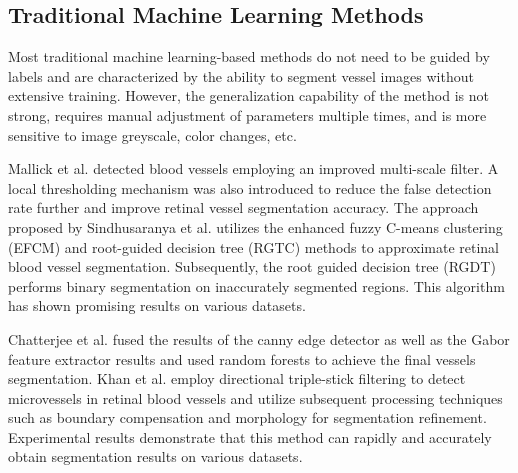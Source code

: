 \documentclass[a4paper,fleqn]{cas-dc}
\begin{document}
\subsection{Traditional Machine Learning Methods}
Most traditional machine learning-based methods do not need to be guided by labels and are characterized by the ability to segment vessel images without extensive training. However, the generalization capability of the method is not strong, requires manual adjustment of parameters multiple times, and is more sensitive to image greyscale, color changes, etc. 

 Mallick et al. \cite{Mallick2019BloodVD} detected blood vessels employing an improved multi-scale filter. A local thresholding mechanism was also introduced to reduce the false detection rate further and improve retinal vessel segmentation accuracy. The approach proposed by Sindhusaranya et al. \cite{Sindhusaranya2023RetinalBV} utilizes the enhanced fuzzy C-means clustering (EFCM) and root-guided decision tree (RGTC) methods to approximate retinal blood vessel segmentation. Subsequently, the root guided decision tree (RGDT) performs binary segmentation on inaccurately segmented regions. This algorithm has shown promising results on various datasets.

   Chatterjee et al. \cite{Chatterjee2021RetinalBV} fused the results of the canny edge detector as well as the Gabor feature extractor results and used random forests to achieve the final vessels segmentation. Khan et al. \citet{Khan2022WidthwiseVB} employ directional triple-stick filtering to detect microvessels in retinal blood vessels and utilize subsequent processing techniques such as boundary compensation and morphology for segmentation refinement. Experimental results demonstrate that this method can rapidly and accurately obtain segmentation results on various datasets.
\end{document}
